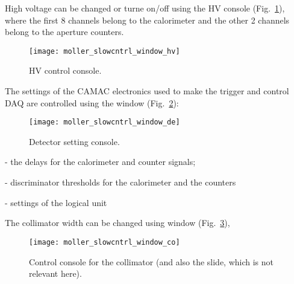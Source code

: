 {{  High voltage can be changed or turne on/off using the HV console (Fig.~\ref{fig:moller_slowc_hv}),
  where the first 8 channels belong to the calorimeter and the other 2 channels
  belong to the aperture counters.
   \begin{figure}[htb]
      \begin{center}
          \texttt{[image: moller\_slowcntrl\_window\_hv]}
      \end{center}
      \caption[M{\o}ller:HV control]{HV control console.
            }
      \label{fig:moller_slowc_hv} 
   \end{figure}  
  The settings of the CAMAC electronics used to make the trigger
  and control DAQ are controlled using the  window (Fig.~\ref{fig:moller_slowc_de}):
   \begin{figure}[htb]
      \begin{center}
          \texttt{[image: moller\_slowcntrl\_window\_de]}
      \end{center}
      \caption[M{\o}ller: electronics control]{Detector setting console.
            }
      \label{fig:moller_slowc_de} 
   \end{figure}  
   \begin{list}{--}{\setlength{\itemsep}{-0.15cm}}
     \item {} - the delays for the calorimeter and counter signals;
     \item {} - discriminator thresholds for the calorimeter and the counters
     \item {} - settings of the logical unit
   \end{list}
  The collimator width can be changed using
   window (Fig.~\ref{fig:moller_slowc_co}),
   \begin{figure}[htb]
      \begin{center}
          \texttt{[image: moller\_slowcntrl\_window\_co]}
      \end{center}
      \caption[M{\o}ller: collimator control]{Control console for the collimator 
               (and also the slide, which is not relevant here).
            }
      \label{fig:moller_slowc_co} 
   \end{figure}  
}

}

